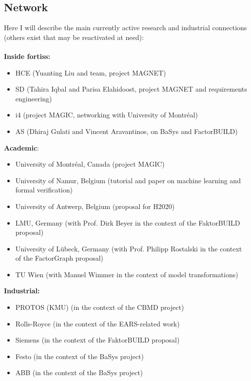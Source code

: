\documentclass{scrartcl}
\begin{document}
\begin{appendices}
\section{Network}
\label{app:network}

Here I will describe the main currently active research and industrial
connections (others exist that may be reactivated at need):\\\\
\textbf{Inside fortiss:}

\begin{itemize}
  \item HCE (Yuanting Liu and team, project MAGNET)
  \item SD (Tahira Iqbal and Parisa Elahidoost, project MAGNET and requirements
  engineering)
  \item i4 (project MAGIC, networking with University of Montréal)
  \item AS (Dhiraj Gulati and Vincent Aravantinos, on BaSys and FactorBUILD)\\
\end{itemize}
\textbf{Academic}:

\begin{itemize}
  \item University of Montr\'eal, Canada (project MAGIC)
  \item University of Namur, Belgium (tutorial and paper on machine learning and
  formal verification)
  \item University of Antwerp, Belgium (proposal for H2020)
  \item LMU, Germany (with Prof. Dirk Beyer in the context of the FaktorBUILD
  proposal)
  \item University of L\"ubeck, Germany (with Prof. Philipp Rostalski in the
  context of the FactorGraph proposal)
  \item TU Wien (with Manuel Wimmer in the context of model transformations)\\
\end{itemize}
\textbf{Industrial:}

\begin{itemize}
  \item PROTOS (KMU) (in the context of the CBMD project)
  \item Rolls-Royce (in the context of the EARS-related work)
  \item Siemens (in the context of the FaktorBUILD proposal)
  \item Festo (in the context of the BaSys project)
  \item ABB (in the context of the BaSys project)
\end{itemize}


\end{appendices}
\end{document}
